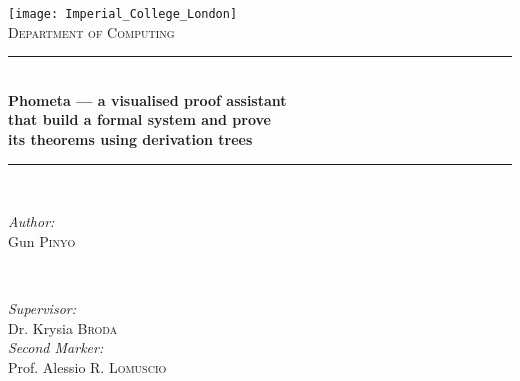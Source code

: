 \begin{titlepage}

\newcommand{\HRule}{\rule{\linewidth}{0.5mm}} %

\center %


\texttt{[image: Imperial\_College\_London]}\\[1cm] %

\textsc{\LARGE Department of Computing}\\[2cm] %


\HRule\ \\ [0.4cm]

{ \huge \bfseries Phometa --- a visualised proof assistant}\\[0.4cm] %
{ \huge \bfseries that build a formal system and prove }\\[0.4cm] %
{ \huge \bfseries its theorems using derivation trees }\\[0.4cm] %

\HRule\ \\ [1.5cm]


\begin{minipage}{0.3\textwidth}
\begin{flushleft} \Large
\emph{Author:}\\
Gun \textsc{Pinyo} %
\end{flushleft}
\end{minipage}
~
\begin{minipage}{0.5\textwidth}
\begin{flushright} \Large
\emph{Supervisor:} \\
Dr. Krysia \textsc{Broda} \\ [0.5cm] %
\emph{Second Marker:} \\
Prof. Alessio \textsc{R. Lomuscio} \\ %
\end{flushright}
\end{minipage}\\[2cm]


\end{titlepage}

